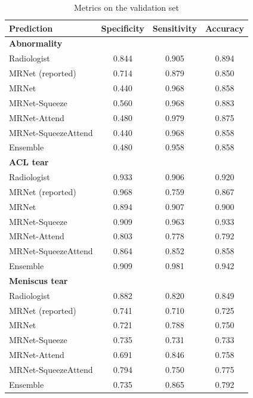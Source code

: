 \documentclass[10pt,twocolumn,letterpaper]{article}
\begin{document}
\begin{table}[h!]
\begin{center}
\begin{tabular}{|l|c|c|c|}
\hline
Prediction & Specificity & Sensitivity & Accuracy \\
\hline
\multicolumn{4}{l}{\textbf{Abnormality} }\\
\hline
Radiologist & 0.844 & 0.905 & 0.894 \\
MRNet (reported) & 0.714 & 0.879 & 0.850 \\
\hline
MRNet & 0.440 & 0.968 & 0.858 \\
MRNet-Squeeze & 0.560 & 0.968 & 0.883 \\
MRNet-Attend & 0.480 & 0.979 & 0.875  \\
MRNet-SqueezeAttend & 0.440 & 0.968 & 0.858 \\
\hline
Ensemble & 0.480 & 0.958 & 0.858 \\
\hline
\multicolumn{4}{l}{\textbf{ACL tear} }\\
\hline
Radiologist & 0.933 & 0.906 & 0.920 \\
MRNet (reported) & 0.968 & 0.759 & 0.867 \\
\hline
MRNet & 0.894 & 0.907 & 0.900 \\
MRNet-Squeeze & 0.909 & 0.963 & 0.933 \\
MRNet-Attend & 0.803 & 0.778 &  0.792 \\
MRNet-SqueezeAttend & 0.864 & 0.852 & 0.858 \\
\hline
Ensemble & 0.909 & 0.981 & 0.942 \\
\hline
\multicolumn{4}{l}{\textbf{Meniscus tear} }\\
\hline
Radiologist & 0.882 & 0.820 & 0.849 \\
MRNet (reported) & 0.741 & 0.710 & 0.725 \\
\hline
MRNet & 0.721 & 0.788 & 0.750 \\
MRNet-Squeeze & 0.735 & 0.731 & 0.733 \\
MRNet-Attend & 0.691 & 0.846 &  0.758 \\
MRNet-SqueezeAttend & 0.794 & 0.750 & 0.775 \\

\hline
Ensemble & 0.735 & 0.865 & 0.792 \\
\hline
\end{tabular}
\end{center}
\caption{Metrics on the validation set}
\label{tab:metrics}
\end{table}
\end{document}
